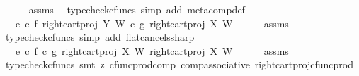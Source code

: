 \begin{isabellebody}
\ \ \ \ \isamarkupfalse%
\ assms\ \isamarkupfalse%
\ {\isacharparenleft}{\kern0pt}typecheck{\isacharunderscore}{\kern0pt}cfuncs{\isacharcomma}{\kern0pt}\ simp\ add{\isacharcolon}{\kern0pt}\ meta{\isacharunderscore}{\kern0pt}comp{}{\isacharunderscore}{\kern0pt}def{}{\isacharparenright}{\kern0pt}\isanewline
\ \ \isamarkupfalse%
\ \isamarkupfalse%
\ {\isachardoublequoteopen}{\isachardot}{\kern0pt}{\isachardot}{\kern0pt}{\isachardot}{\kern0pt}\ {\isacharequal}{\kern0pt}\ {\isacharparenleft}{\kern0pt}{\isacharparenleft}{\kern0pt}e\isactrlsup {\isasymflat}\ {\isasymcirc}\isactrlsub c\ {\isasymlangle}f\isactrlsup {\isasymflat}{\isacharcomma}{\kern0pt}\ right{\isacharunderscore}{\kern0pt}cart{\isacharunderscore}{\kern0pt}proj\ Y\ W{\isasymrangle}{\isacharparenright}{\kern0pt}\ {\isasymcirc}\isactrlsub c\ {\isasymlangle}g\isactrlsup {\isasymflat}{\isacharcomma}{\kern0pt}\ right{\isacharunderscore}{\kern0pt}cart{\isacharunderscore}{\kern0pt}proj\ X\ W{\isasymrangle}{\isacharparenright}{\kern0pt}\isactrlsup {\isasymsharp}{\isachardoublequoteclose}\isanewline
\ \ \ \ \isamarkupfalse%
\ assms\ \isamarkupfalse%
\ {\isacharparenleft}{\kern0pt}typecheck{\isacharunderscore}{\kern0pt}cfuncs{\isacharcomma}{\kern0pt}\ simp\ add{\isacharcolon}{\kern0pt}\ flat{\isacharunderscore}{\kern0pt}cancels{\isacharunderscore}{\kern0pt}sharp{\isacharparenright}{\kern0pt}\ \ \ \ \isanewline
\ \ \isamarkupfalse%
\ \isamarkupfalse%
\ {\isachardoublequoteopen}{\isachardot}{\kern0pt}{\isachardot}{\kern0pt}{\isachardot}{\kern0pt}\ {\isacharequal}{\kern0pt}\ {\isacharparenleft}{\kern0pt}e\isactrlsup {\isasymflat}\ {\isasymcirc}\isactrlsub c\ {\isasymlangle}f\isactrlsup {\isasymflat}\ {\isasymcirc}\isactrlsub c\ {\isasymlangle}g\isactrlsup {\isasymflat}{\isacharcomma}{\kern0pt}\ right{\isacharunderscore}{\kern0pt}cart{\isacharunderscore}{\kern0pt}proj\ X\ W{\isasymrangle}\ {\isacharcomma}{\kern0pt}right{\isacharunderscore}{\kern0pt}cart{\isacharunderscore}{\kern0pt}proj\ X\ W{\isasymrangle}{\isacharparenright}{\kern0pt}\isactrlsup {\isasymsharp}{\isachardoublequoteclose}\isanewline
\ \ \ \ \isamarkupfalse%
\ assms\ \isamarkupfalse%
\ {\isacharparenleft}{\kern0pt}typecheck{\isacharunderscore}{\kern0pt}cfuncs{\isacharcomma}{\kern0pt}\ smt\ {\isacharparenleft}{\kern0pt}z{}{\isacharparenright}{\kern0pt}\ cfunc{\isacharunderscore}{\kern0pt}prod{\isacharunderscore}{\kern0pt}comp\ comp{\isacharunderscore}{\kern0pt}associative{}\ right{\isacharunderscore}{\kern0pt}cart{\isacharunderscore}{\kern0pt}proj{\isacharunderscore}{\kern0pt}cfunc{\isacharunderscore}{\kern0pt}prod{\isacharparenright}{\kern0pt}\isanewline

\end{isabellebody}
